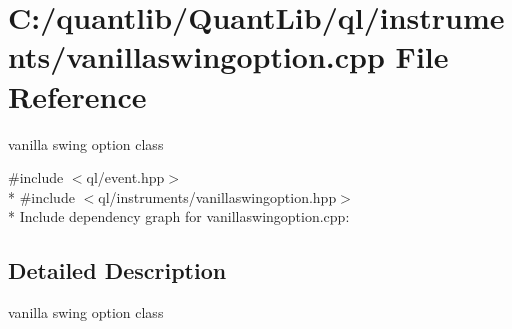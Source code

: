 \section{C\+:/quantlib/\+Quant\+Lib/ql/instruments/vanillaswingoption.cpp File Reference}
\label{vanillaswingoption_8cpp}


vanilla swing option class  


{\ttfamily \#include $<$ql/event.\+hpp$>$}\\*
{\ttfamily \#include $<$ql/instruments/vanillaswingoption.\+hpp$>$}\\*
Include dependency graph for vanillaswingoption.\+cpp\+:


\subsection{Detailed Description}
vanilla swing option class 

